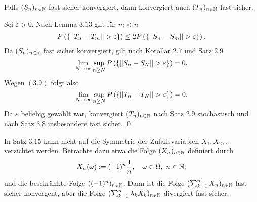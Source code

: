 \begin{theorem}
    Falls $(S_n)_{n \in \mathbb{N}}$ fast sicher konvergiert, dann konvergiert auch $(T_n)_{n \in \mathbb{N}}$ fast sicher. 
\end{theorem}
\begin{proof*}
    Sei $\varepsilon > 0$. Nach Lemma $3.13$ gilt für $m < n$
    \begin{align}
        P\left(\left\{ \lvert\lvert T_n - T_m \rvert\rvert > \varepsilon \right\}\right) \leq 2P\left(\left\{ \lvert\lvert S_n - S_m \rvert\rvert > \varepsilon \right\}\right). 
    \end{align}
    Da $(S_n)_{n \in \mathbb{N}}$ fast sicher konvergiert, gilt nach Korollar $2.7$ und Satz $2.9$
    $$
        \lim_{N \to \infty} \sup_{n \geq N}P\left(\left\{ \lvert\lvert S_n-S_N \rvert\rvert > \varepsilon \right\}\right) = 0. 
    $$
    Wegen $(3.9)$ folgt also 
    $$
        \lim_{N \to \infty} \sup_{n \geq N}P\left(\left\{ \lvert\lvert T_n-T_N \rvert\rvert > \varepsilon \right\}\right) = 0.
    $$
    Da $\varepsilon$ beliebig gewählt war, konvergiert $(T_n)_{n \in \mathbb{N}}$ nach Satz $2.9$ stochastisch und nach Satz $3.8$ insbesondere fast sicher. \qed
\end{proof*}

\begin{remark}
    In Satz $3.15$ kann nicht auf die Symmetrie der Zufallsvariablen $X_1,X_2,...$ verzichtet werden. Betrachte dazu etwa die Folge $(X_n)_{n \in \mathbb{N}}$ definiert durch
    $$
        X_n(\omega) := (-1)^n \frac{1}{n},  \quad \omega \in \Omega, \ n \in \mathbb{N}, 
    $$ 
    und die beschränkte Folge $((-1)^n)_{n \in \mathbb{N}}$. Dann ist die Folge $(\sum_{k=1}^n X_n)_{n \in \mathbb{N}}$ fast sicher konvergent, aber die Folge $(\sum_{k=1}^n\lambda_k X_k)_{n \in \mathbb{N}}$ divergiert fast sicher. 
    \qexampled
\end{remark}